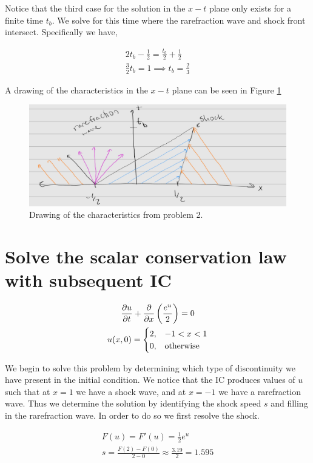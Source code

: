 \documentclass{article}
\begin{document}
Notice that the third case for the solution in the $x-t$ plane only exists for a
finite time $t_b$. We solve for this time where the rarefraction wave and shock
front intersect. Specifically we have, 

\begin{gather*}
    2t_b - \frac{1}{2} = \frac{t_b}{2} + \frac{1}{2}\\
    \frac{3}{2}t_b = 1 \implies t_b = \frac{2}{3}
\end{gather*}

A drawing of the characteristics in the $x-t$ plane can be seen in Figure
\ref{fig:p2_drawing}

\begin{figure}[t]
    \centering
    \includegraphics[width=.7\textwidth]{prob2_drawing.jpg}
    \caption{Drawing of the characteristics from problem 2.}
    \label{fig:p2_drawing}
\end{figure}



\section{Solve the scalar conservation law with subsequent IC}
\begin{gather*}
    \frac{\partial u}{\partial t} + \frac{\partial }{\partial x}\left(\frac{e^u}{2}\right) = 0\\
    u(x,0) = \begin{cases}
        2, & -1 < x < 1\\
        0, & \text{otherwise}
        \end{cases}
\end{gather*}

We begin to solve this problem by determining which type of discontinuity we
have present in the initial condition. We notice that the IC produces values of
$u$ such that at $x = 1$ we have a shock wave, and at $x = -1$ we have a
rarefraction wave. Thus we determine the solution by identifying the shock speed
$s$ and filling in the rarefraction wave. In order to do so we first resolve the
shock. 

\begin{gather*}
    F(u) = F'(u) = \frac{1}{2}e^{u}\\
    s = \frac{F(2) - F(0)}{2 - 0} \approx \frac{3.19}{2} = 1.595
\end{gather*}
\end{document}
